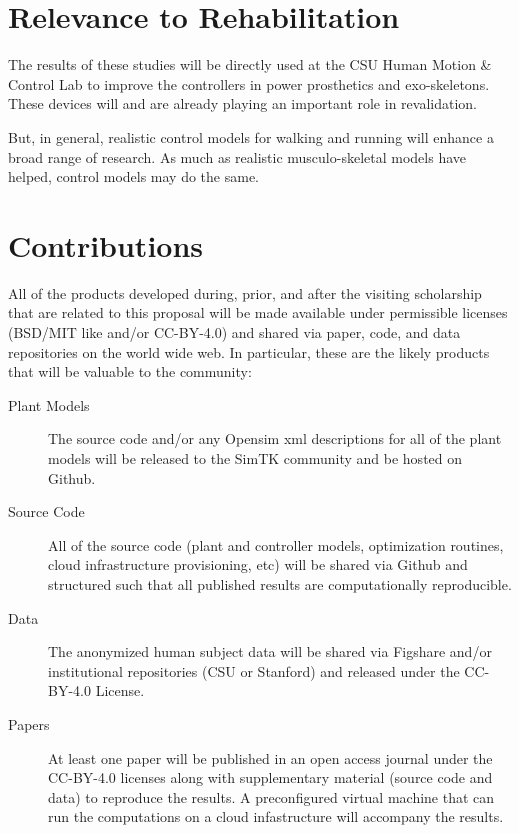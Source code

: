 \documentclass[11pt]{article}
\begin{document}
\section*{Relevance to Rehabilitation}

The results of these studies will be directly used at the CSU Human Motion \&
Control Lab to improve the controllers in power prosthetics and exo-skeletons.
These devices will and are already playing an important role in revalidation.

But, in general, realistic control models for walking and running will enhance
a broad range of research. As much as realistic musculo-skeletal models have
helped, control models may do the same.

\section*{Contributions}

All of the products developed during, prior, and after the visiting scholarship
that are related to this proposal will be made available under permissible
licenses (BSD/MIT like and/or CC-BY-4.0) and shared via paper, code, and data
repositories on the world wide web. In particular, these are the likely
products that will be valuable to the community:

\begin{description}
  \item[Plant Models] The source code and/or any Opensim xml descriptions for
    all of the plant models will be released to the SimTK community and be
    hosted on Github.
  \item[Source Code] All of the source code (plant and controller models,
    optimization routines, cloud infrastructure provisioning, etc) will be
    shared via Github and structured such that all published results are
    computationally reproducible.
  \item[Data] The anonymized human subject data will be shared via Figshare
    and/or institutional repositories (CSU or Stanford) and released under the
    CC-BY-4.0 License.
  \item[Papers] At least one paper will be published in an open access journal
    under the CC-BY-4.0 licenses along with supplementary material (source code
    and data) to reproduce the results. A preconfigured virtual machine that
    can run the computations on a cloud infastructure will accompany the
    results.
\end{description}
\end{document}
